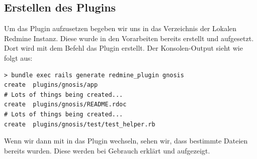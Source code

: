 \begin{minipage}{\textwidth}
  \subsection{Erstellen des Plugins}
  Um das Plugin aufzusetzen begeben wir uns in das Verzeichnis der Lokalen Redmine Instanz. Diese wurde in den
  Vorarbeiten bereits erstellt und aufgesetzt. \newline
  Dort wird mit dem Befehl  das Plugin erstellt. Der
  Konsolen-Output sieht wie folgt aus:
  \begin{codebox}[]
    \begin{verbatim}
> bundle exec rails generate redmine_plugin gnosis
create  plugins/gnosis/app
# Lots of things being created...
create  plugins/gnosis/README.rdoc
# Lots of things being created...
create  plugins/gnosis/test/test_helper.rb
    \end{verbatim}
  \end{codebox}

  Wenn wir dann mit  in das Plugin wechseln, sehen wir, dass bestimmte Dateien
  bereits wurden. Diese werden bei Gebrauch erklärt und aufgezeigt.
\end{minipage}

